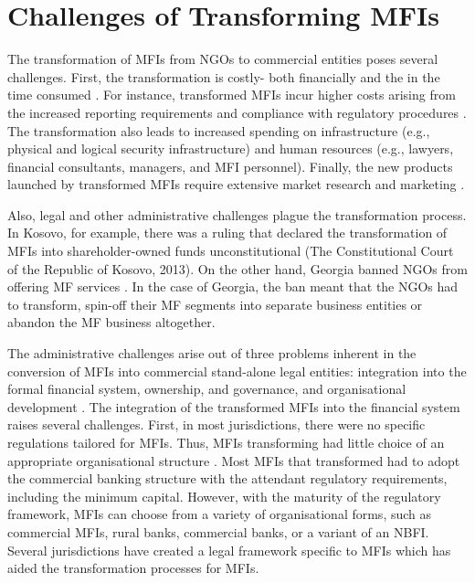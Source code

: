 \documentclass[a4paper, nobind]{templates/ociamthesis}
\begin{document}
\hypertarget{challenges-of-transforming-mfis}{%
\section{Challenges of Transforming MFIs}\label{challenges-of-transforming-mfis}}

\noindent The transformation of MFIs from NGOs to commercial entities poses several challenges. First, the transformation is costly- both financially and the in the time consumed \autocite{frank2008stemming}. For instance, transformed MFIs incur higher costs arising from the increased reporting requirements and compliance with regulatory procedures \autocite{meagher2006microfinance}. The transformation also leads to increased spending on infrastructure (e.g., physical and logical security infrastructure) and human resources (e.g., lawyers, financial consultants, managers, and MFI personnel). Finally, the new products launched by transformed MFIs require extensive market research and marketing \autocite{campion1999institutional}.

Also, legal and other administrative challenges plague the transformation process. In Kosovo, for example, there was a ruling that declared the transformation of MFIs into shareholder-owned funds unconstitutional (The Constitutional Court of the Republic of Kosovo, 2013). On the other hand, Georgia banned NGOs from offering MF services \autocite{lauer2008transforming}. In the case of Georgia, the ban meant that the NGOs had to transform, spin-off their MF segments into separate business entities or abandon the MF business altogether.

The administrative challenges arise out of three problems inherent in the conversion of MFIs into commercial stand-alone legal entities: integration into the formal financial system, ownership, and governance, and organisational development \autocite{campion1999institutional,lauer2008transforming,mori2014boards}. The integration of the transformed MFIs into the financial system raises several challenges. First, in most jurisdictions, there were no specific regulations tailored for MFIs. Thus, MFIs transforming had little choice of an appropriate organisational structure \autocite{campion1999institutional}. Most MFIs that transformed had to adopt the commercial banking structure with the attendant regulatory requirements, including the minimum capital. However, with the maturity of the regulatory framework, MFIs can choose from a variety of organisational forms, such as commercial MFIs, rural banks, commercial banks, or a variant of an NBFI. Several jurisdictions have created a legal framework specific to MFIs which has aided the transformation processes for MFIs.
\end{document}
